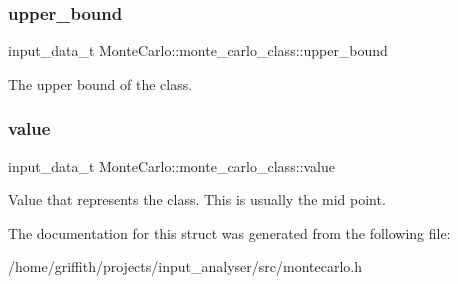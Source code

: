 \subsubsection{\texorpdfstring{upper\+\_\+bound}{upper\_bound}}
{\footnotesize\ttfamily input\+\_\+data\+\_\+t Monte\+Carlo\+::monte\+\_\+carlo\+\_\+class\+::upper\+\_\+bound}

The upper bound of the class. \mbox{\label{structMonteCarlo_1_1monte__carlo__class_ab836eb958a7396f9d12b3d15683527e5}} 
\subsubsection{\texorpdfstring{value}{value}}
{\footnotesize\ttfamily input\+\_\+data\+\_\+t Monte\+Carlo\+::monte\+\_\+carlo\+\_\+class\+::value}

Value that represents the class. This is usually the mid point. 

The documentation for this struct was generated from the following file\+:\begin{DoxyCompactItemize}
\item 
/home/griffith/projects/input\+\_\+analyser/src/montecarlo.\+h\end{DoxyCompactItemize}
